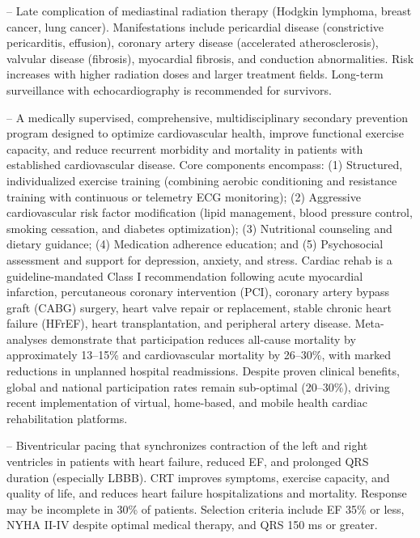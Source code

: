 -- Late complication of mediastinal radiation therapy (Hodgkin lymphoma, breast cancer, lung cancer). Manifestations include pericardial disease (constrictive pericarditis, effusion), coronary artery disease (accelerated atherosclerosis), valvular disease (fibrosis), myocardial fibrosis, and conduction abnormalities. Risk increases with higher radiation doses and larger treatment fields. Long-term surveillance with echocardiography is recommended for survivors.

-- A medically supervised, comprehensive, multidisciplinary secondary prevention program designed to optimize cardiovascular health, improve functional exercise capacity, and reduce recurrent morbidity and mortality in patients with established cardiovascular disease. Core components encompass: (1) Structured, individualized exercise training (combining aerobic conditioning and resistance training with continuous or telemetry ECG monitoring); (2) Aggressive cardiovascular risk factor modification (lipid management, blood pressure control, smoking cessation, and diabetes optimization); (3) Nutritional counseling and dietary guidance; (4) Medication adherence education; and (5) Psychosocial assessment and support for depression, anxiety, and stress. Cardiac rehab is a guideline-mandated Class I recommendation following acute myocardial infarction, percutaneous coronary intervention (PCI), coronary artery bypass graft (CABG) surgery, heart valve repair or replacement, stable chronic heart failure (HFrEF), heart transplantation, and peripheral artery disease. Meta-analyses demonstrate that participation reduces all-cause mortality by approximately 13--15\% and cardiovascular mortality by 26--30\%, with marked reductions in unplanned hospital readmissions. Despite proven clinical benefits, global and national participation rates remain sub-optimal (20--30\%), driving recent implementation of virtual, home-based, and mobile health cardiac rehabilitation platforms.

-- Biventricular pacing that synchronizes contraction of the left and right ventricles in patients with heart failure, reduced EF, and prolonged QRS duration (especially LBBB). CRT improves symptoms, exercise capacity, and quality of life, and reduces heart failure hospitalizations and mortality. Response may be incomplete in 30\% of patients. Selection criteria include EF 35\% or less, NYHA II-IV despite optimal medical therapy, and QRS 150 ms or greater.

